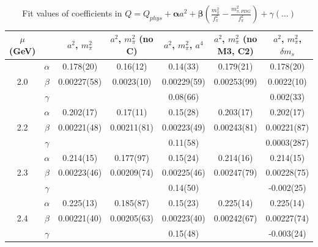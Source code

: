 \documentclass[12pt]{extarticle}
\begin{document}
\begin{table}[h!]
\begin{center}
\begin{tabular}{|c c|c|c|c|c|c|}
\hline
$\mu$ (GeV) &  & $a^2$, $m_\pi^2$& $a^2$, $m_\pi^2$ (no C)& $a^2$, $m_\pi^2$, $a^4$& $a^2$, $m_\pi^2$ (no M3, C2)& $a^2$, $m_\pi^2$, $\delta m_s$\\
\hline
\multirow{3}{0.5in}{2.0} & $\alpha$ & 0.178(20)& 0.16(12)& 0.14(33)& 0.179(21)& 0.178(20)\\
 & $\beta$ & 0.00227(58)& 0.0023(10)& 0.00229(59)& 0.00253(99)& 0.0022(10)\\
 & $\gamma$ &  &  & 0.08(66)&  & 0.002(33)\\
\hline
\multirow{3}{0.5in}{2.2} & $\alpha$ & 0.202(17)& 0.17(11)& 0.15(28)& 0.203(17)& 0.202(17)\\
 & $\beta$ & 0.00221(48)& 0.00211(81)& 0.00223(49)& 0.00243(81)& 0.00221(87)\\
 & $\gamma$ &  &  & 0.11(58)&  & 0.0003(287)\\
\hline
\multirow{3}{0.5in}{2.3} & $\alpha$ & 0.214(15)& 0.177(97)& 0.15(24)& 0.214(16)& 0.214(15)\\
 & $\beta$ & 0.00223(46)& 0.00209(74)& 0.00225(46)& 0.00247(79)& 0.00228(75)\\
 & $\gamma$ &  &  & 0.14(50)&  & -0.002(25)\\
\hline
\multirow{3}{0.5in}{2.4} & $\alpha$ & 0.225(13)& 0.185(87)& 0.15(23)& 0.225(14)& 0.225(14)\\
 & $\beta$ & 0.00221(40)& 0.00205(63)& 0.00223(40)& 0.00242(67)& 0.00227(74)\\
 & $\gamma$ &  &  & 0.15(48)&  & -0.003(24)\\
\hline
\end{tabular}
\caption{Fit values of coefficients in $Q = Q_{phys} + \mathbf{\alpha} a^2 + \mathbf{\beta}\left(\frac{m_\pi^2}{f_\pi^2}-\frac{m_{\pi,PDG}^2}{f_\pi^2}\right) + \gamma(\ldots)$}
\end{center}
\end{table}




















\clearpage
\end{document}
